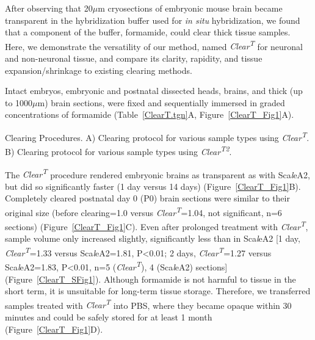 After observing that 20$\mu$m cryosections of embryonic mouse brain became transparent in the hybridization buffer used for \emph{in situ} hybridization, we found that a component of the buffer, formamide, could clear thick tissue samples.
Here, we demonstrate the versatility of our method, named \emph{Clear\textsuperscript{T}} for neuronal and non-neuronal tissue, and compare its clarity, rapidity, and tissue expansion/shrinkage to existing clearing methods.

Intact embryos, embryonic and postnatal dissected heads, brains, and thick (up to 1000$\mu$m) brain sections, were fixed and sequentially immersed in graded concentrations of formamide (Table~\ref{ClearT.tgn}A, Figure~\ref{ClearT_Fig1}A).
\begin{table}[hbtp]
    \begin{center}
        \caption[Clearing Procedures.]
        {Clearing Procedures.
		A) Clearing protocol for various sample types using \emph{Clear\textsuperscript{T}}.
		B) Clearing protocol for various sample types using \emph{Clear\textsuperscript{T2}}.
		}
        \label{ClearT.tgn}
    \end{center}
\end{table}
The \emph{Clear\textsuperscript{T}} procedure rendered embryonic brains as transparent as with Sca\emph{l}eA2, but did so significantly faster (1 day versus 14 days) (Figure~\ref{ClearT_Fig1}B).
Completely cleared postnatal day 0 (P0) brain sections were similar to their original size (before clearing=1.0 versus \emph{Clear\textsuperscript{T}}=1.04, not significant, n=6 sections) (Figure~\ref{ClearT_Fig1}C).
Even after prolonged treatment with \emph{Clear\textsuperscript{T}}, sample volume only increased slightly, significantly less than in Sca\emph{l}eA2 [1 day, \emph{Clear\textsuperscript{T}}=1.33 versus Sca\emph{l}eA2=1.81, P<0.01; 2 days, \emph{Clear\textsuperscript{T}}=1.27 versus Sca\emph{l}eA2=1.83, P<0.01, n=5 (\emph{Clear\textsuperscript{T}}), 4 (Sca\emph{l}eA2) sections] (Figure~\ref{ClearT_SFig1}).
Although formamide is not harmful to tissue in the short term, it is unsuitable for long-term tissue storage.
Therefore, we transferred samples treated with \emph{Clear\textsuperscript{T}} into PBS, where they became opaque within 30 minutes and could be safely stored for at least 1 month (Figure~\ref{ClearT_Fig1}D).
